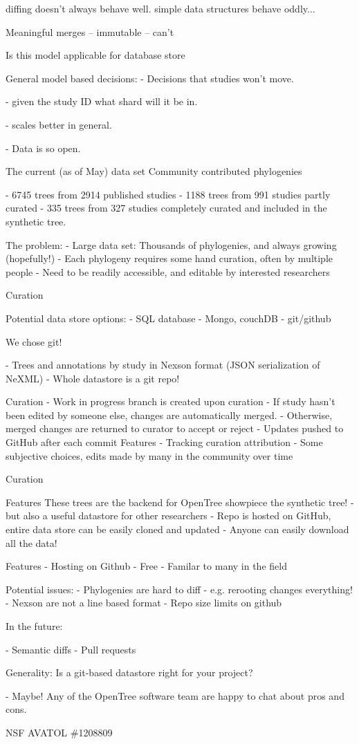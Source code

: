 \documentclass[a4paper,10pt]{article}
\begin{document}
diffing doesn't always behave well.
simple data structures behave oddly...

Meaningful merges
 -- immutable
 -- can't

Is this model applicable for database store

General model based decisions:
- Decisions that studies won't move.

- given the study ID what shard will it be in.

- scales better in general.

- Data is so open.



 The current (as of May) data set
 Community contributed phylogenies

 - 6745 trees from 2914 published studies
 - 1188 trees from 991 studies partly curated 
 - 335 trees from 327 studies completely curated and included in the synthetic tree.

 The problem:
 - Large data set: Thousands of phylogenies, and always growing (hopefully!)
 - Each phylogeny requires some hand curation, often by multiple people
 - Need to be readily accessible, and editable by interested researchers

Curation

 Potential data store options:
 - SQL database
 - Mongo, couchDB
 - git/github


 We chose git!

 - Trees and annotations by study in Nexson format  
(JSON serialization of NeXML)
 - Whole datastore is a git repo!  
 

 Curation
- Work in progress branch is created upon curation  
- If study hasn't been edited by someone else, changes are automatically merged.  
- Otherwise, merged changes are returned to curator to accept or reject
- Updates pushed to GitHub after each commit
 Features
 - Tracking curation attribution  
- Some subjective choices, edits made by many in the community over time

 Curation

 Features
 These trees are the backend for OpenTree showpiece  
 the synthetic tree!
 - but also a useful datastore for other researchers
 - Repo is hosted on GitHub, entire data store can be easily cloned and updated
 - Anyone can easily download all the data!
 
 Features
- Hosting on Github  
- Free  
- Familar to  many in the field


 Potential issues:
 - Phylogenies are hard to diff - e.g. rerooting changes everything!
 - Nexson are not a line based format
 - Repo size limits on github


 In the future:

 - Semantic diffs  
 - Pull requests
 
  
Generality:
Is a git-based datastore right for your project?

 - Maybe! Any of the OpenTree software team are happy to chat about pros and cons.

NSF AVATOL \#1208809  
\end{document}
